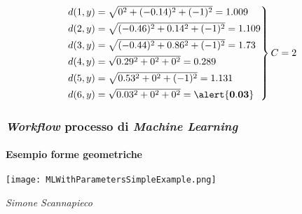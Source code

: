\begin{frame}[t]
{{\begin{itemize}[leftmargin=10pt,align=right]
\[\begin{rcases*}
                    d(1,y) = \sqrt{0^{2} + (-0.14)^{2} + (-1)^{2}} = 1.009 \\
                    d(2,y) = \sqrt{(-0.46)^{2} + 0.14^{2} + (-1)^{2}} = 1.109 \\
                    d(3,y) = \sqrt{(-0.44)^{2} + 0.86^{2} + (-1)^{2}} = 1.73 \\
                    d(4,y) = \sqrt{0.29^{2} + 0^{2} + 0^{2}} = 0.289 \\
                    d(5,y) = \sqrt{0.53^{2} + 0^{2} + (-1)^{2}} = 1.131 \\
                    d(6,y) = \sqrt{0.03^{2} + 0^{2} + 0^{2}} = \alert{\mathbf{0.03}}
                \end{rcases*} C = 2
            \]
        \end{itemize}
    }
}
\end{frame}
%
\begin{frame}[b] \frametitle{\emph{Workflow} processo di \emph{Machine Learning}}
    \framesubtitle{Esempio forme geometriche}
    \begin{center}
        \texttt{[image: MLWithParametersSimpleExample.png]}
    \end{center}
    \begin{flushright}
        {\tiny\textit{\textcopyright Simone Scannapieco}}
    \end{flushright}    
\end{frame}
